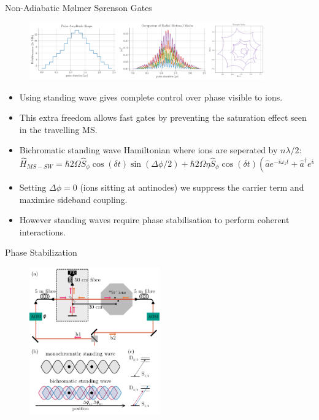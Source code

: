 \documentclass[final]{beamer}
\begin{document}
\begin{frame}{}
\begin{center}
\begin{columns}[t]
\begin{column}{0.49\textwidth}
\begin{alertblock}{Non-Adiabatic Mølmer Sørenson Gates}
      \begin{figure}
        \includegraphics[width=0.9\textwidth]{./figs/loop_closing.png}
      \end{figure}

      \begin{itemize}
      \item Using standing wave gives complete control over phase
        visible to ions.
      \item This extra freedom allows fast gates by preventing the
        saturation effect seen in the travelling MS.
      \item Bichromatic standing wave Hamiltonian where ions are
        seperated by $n\lambda/2$:
      \large$$ \hat{H}_{MS-SW} = \hbar 2\Omega \hat{S}_{\phi}\cos{(\delta t)}\sin{(\Delta\phi/2)} + \hbar 2\Omega\eta \hat{S}_\phi\cos{(\delta t)}(\hat{a}e^{-i\omega_zt} + \hat{a}^\dagger e^{i\omega_zt})\cos{(\Delta\phi/2)}$$\normalsize
      \item Setting $\Delta\phi = 0$ (ions sitting at antinodes) we
        suppress the carrier term and maximise sideband
        coupling.
      \item However standing waves require phase stabilisation to perform
            coherent interactions.
      \end{itemize}
    \end{alertblock}

    \begin{alertblock}{Phase Stabilization}
      \begin{figure}
        \includegraphics[width=0.5\textwidth]{./figs/setup+beams_horizontal.pdf}
      \end{figure}


\end{alertblock}
\end{column}
\end{columns}
\end{center}
\end{frame}
\end{document}
